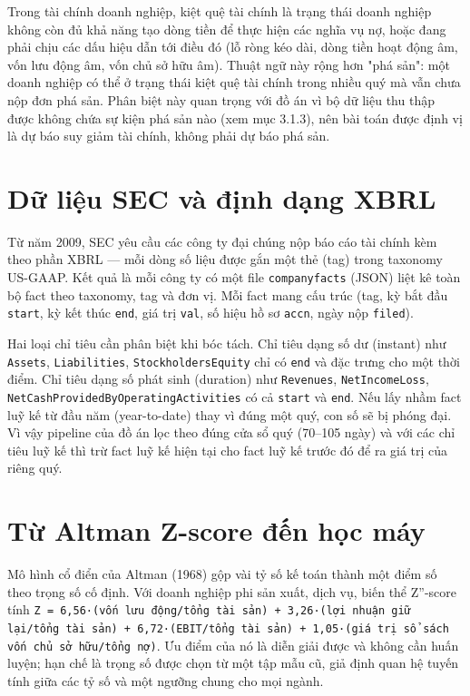 \documentclass[13pt,a4paper]{extreport}
\begin{document}
Trong tài chính doanh nghiệp, kiệt quệ tài chính là trạng thái doanh nghiệp không còn đủ khả năng tạo dòng tiền để thực hiện các nghĩa vụ nợ, hoặc đang phải chịu các dấu hiệu dẫn tới điều đó (lỗ ròng kéo dài, dòng tiền hoạt động âm, vốn lưu động âm, vốn chủ sở hữu âm). Thuật ngữ này rộng hơn "phá sản": một doanh nghiệp có thể ở trạng thái kiệt quệ tài chính trong nhiều quý mà vẫn chưa nộp đơn phá sản. Phân biệt này quan trọng với đồ án vì bộ dữ liệu thu thập được không chứa sự kiện phá sản nào (xem mục 3.1.3), nên bài toán được định vị là dự báo suy giảm tài chính, không phải dự báo phá sản.

\section{Dữ liệu SEC và định dạng XBRL}

Từ năm 2009, SEC yêu cầu các công ty đại chúng nộp báo cáo tài chính kèm theo phần XBRL — mỗi dòng số liệu được gắn một thẻ (tag) trong taxonomy US-GAAP. Kết quả là mỗi công ty có một file \texttt{companyfacts} (JSON) liệt kê toàn bộ fact theo taxonomy, tag và đơn vị. Mỗi fact mang cấu trúc (tag, kỳ bắt đầu \texttt{start}, kỳ kết thúc \texttt{end}, giá trị \texttt{val}, số hiệu hồ sơ \texttt{accn}, ngày nộp \texttt{filed}).

Hai loại chỉ tiêu cần phân biệt khi bóc tách. Chỉ tiêu dạng số dư (instant) như \texttt{Assets}, \texttt{Liabilities}, \texttt{StockholdersEquity} chỉ có \texttt{end} và đặc trưng cho một thời điểm. Chỉ tiêu dạng số phát sinh (duration) như \texttt{Revenues}, \texttt{NetIncomeLoss}, \texttt{NetCashProvidedByOperatingActivities} có cả \texttt{start} và \texttt{end}. Nếu lấy nhầm fact luỹ kế từ đầu năm (year-to-date) thay vì đúng một quý, con số sẽ bị phóng đại. Vì vậy pipeline của đồ án lọc theo đúng cửa sổ quý (70–105 ngày) và với các chỉ tiêu luỹ kế thì trừ fact luỹ kế hiện tại cho fact luỹ kế trước đó để ra giá trị của riêng quý.

\section{Từ Altman Z-score đến học máy}

Mô hình cổ điển của Altman (1968) gộp vài tỷ số kế toán thành một điểm số theo trọng số cố định. Với doanh nghiệp phi sản xuất, dịch vụ, biến thể Z''-score tính \texttt{Z = 6,56·(vốn lưu động/tổng tài sản) + 3,26·(lợi nhuận giữ lại/tổng tài sản) + 6,72·(EBIT/tổng tài sản) + 1,05·(giá trị sổ sách vốn chủ sở hữu/tổng nợ)}. Ưu điểm của nó là diễn giải được và không cần huấn luyện; hạn chế là trọng số được chọn từ một tập mẫu cũ, giả định quan hệ tuyến tính giữa các tỷ số và một ngưỡng chung cho mọi ngành.
\end{document}
